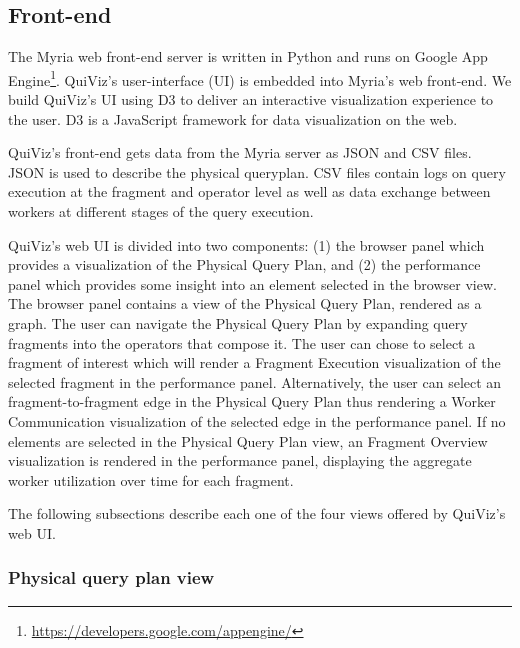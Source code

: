 \documentclass{chi2009}
\newcommand*{\system}{QuiViz\xspace}
\newcommand*{\graph}{Physical Query Plan\xspace}
\newcommand*{\fragment}{Fragment Execution\xspace}
\newcommand*{\network}{Worker Communication\xspace}
\newcommand*{\overall}{Fragment Overview\xspace}
\begin{document}
\subsection{Front-end}
\label{sec:front}

The Myria web front-end server is written in Python and runs on Google App Engine\footnote{\url{https://developers.google.com/appengine/}}. \system's user-interface (UI) is embedded into Myria's web front-end. We build \system's UI using D3\cite{2011-d3} to deliver an interactive visualization experience to the user. D3 is a JavaScript framework for data visualization on the web.

\system's front-end gets data from the Myria server as JSON and CSV files. JSON is used to describe the physical queryplan. CSV files contain logs on query execution at the fragment and operator level as well as data exchange between workers at different stages of the query execution.

\system's web UI is divided into two components: (1) the browser panel which provides a visualization of the \graph, and (2) the performance panel which provides some insight into an element selected in the browser view. The browser panel contains a view of the \graph, rendered as a graph. The user can navigate the \graph by expanding query fragments into the operators that compose it. The user can chose to select a fragment of interest which will render a \fragment visualization of the selected fragment in the performance panel. Alternatively, the user can select an fragment-to-fragment edge in the \graph thus rendering a \network visualization of the selected edge in the performance panel. If no elements are selected in the \graph view, an \overall visualization is rendered in the performance panel, displaying the aggregate worker utilization over time for each fragment.

The following subsections describe each one of the four views offered by \system's web UI.


\subsubsection{Physical query plan view}


\end{document}
